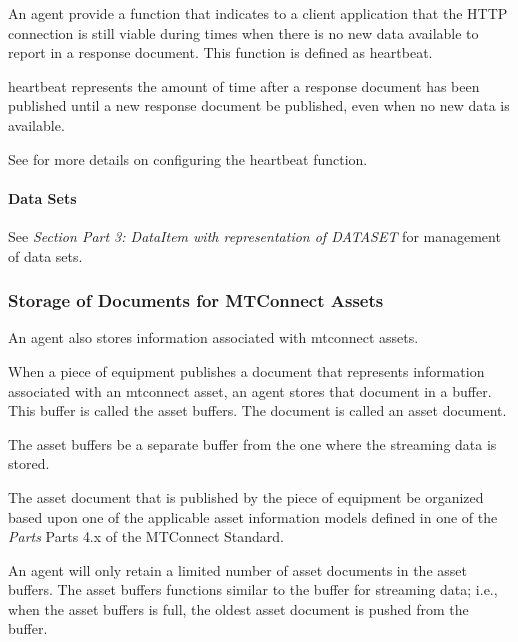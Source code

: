 \documentclass{mtconnect}	%
\providecommand{\DIFadd}[1]{{\hspace{0pt}\protect\color{blue}#1}} %
\providecommand{\DIFdel}[1]{{\hspace{0pt}\protect\color{red}#1}}                      %
\providecommand{\DIFaddbegin}{} %
\providecommand{\DIFaddend}{} %
\providecommand{\DIFdelbegin}{} %
\providecommand{\DIFdelend}{} %
\begin{document}
An \gls{agent} \MUST provide a function that indicates to a client application that the HTTP connection is still viable during times when there is no new data available to report in a \gls{response document}.  This function is defined as \gls{heartbeat}.

\gls{heartbeat} represents the amount of time after a \gls{response document} has been published until a new \gls{response document} \MUST be published, even when no new data is available.

See  for more details on configuring the \gls{heartbeat} function.

\paragraph{Data Sets}\mbox{}
\label{sec:Data Sets}

See  \textit{Section Part 3: DataItem with representation of DATA\textunderscore SET} for management of \glspl{data set}.


\subsubsection{Storage of Documents for MTConnect Assets}

An \gls{agent} also stores information associated with \glspl{mtconnect asset}.

When a piece of equipment publishes a document that represents information associated with an \gls{mtconnect asset}, an \gls{agent} stores that document in a \gls{buffer}.  This \gls{buffer} is called the \glspl{asset buffer}.  The document is called an \gls{asset document}.

The \glspl{asset buffer} \MUST be a separate \gls{buffer} from the one where the \gls{streaming data} is stored.

The \gls{asset document} that is published by the piece of equipment \MUST be organized based upon one of the applicable \glspl{asset information model} defined in one of the \DIFdelbegin \DIFdel{\textit{Parts} }\DIFdelend \DIFaddbegin \DIFadd{Parts }\DIFaddend 4.x of the MTConnect Standard.

An \gls{agent} will only retain a limited number of \glspl{asset document} in the \glspl{asset buffer}.  The \glspl{asset buffer} functions similar to the \gls{buffer} for \gls{streaming data}; i.e., when the \glspl{asset buffer} is full, the oldest \gls{asset document} is pushed from the \gls{buffer}.
\end{document}
